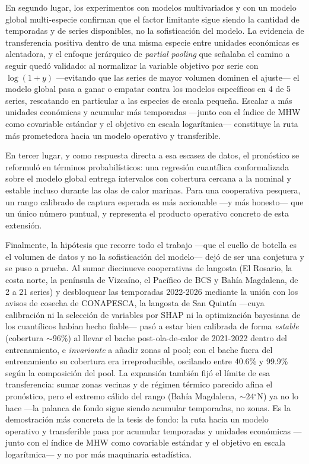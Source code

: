 \documentclass[twoside,11pt]{article}
\begin{document}
En segundo lugar, los experimentos con modelos multivariados y con un modelo global multi-especie confirman que el factor limitante sigue siendo la cantidad de temporadas y de series disponibles, no la sofisticación del modelo. La evidencia de transferencia positiva dentro de una misma especie entre unidades económicas es alentadora, y el enfoque jerárquico de \emph{partial pooling} que señalaba el camino a seguir quedó validado: al normalizar la variable objetivo por serie con $\log(1+y)$ —evitando que las series de mayor volumen dominen el ajuste— el modelo global pasa a ganar o empatar contra los modelos específicos en 4 de 5 series, rescatando en particular a las especies de escala pequeña. Escalar a más unidades económicas y acumular más temporadas —junto con el índice de MHW como covariable estándar y el objetivo en escala logarítmica— constituye la ruta más prometedora hacia un modelo operativo y transferible.

En tercer lugar, y como respuesta directa a esa escasez de datos, el pronóstico se reformuló en términos probabilísticos: una regresión cuantílica conformalizada sobre el modelo global entrega intervalos con cobertura cercana a la nominal y estable incluso durante las olas de calor marinas. Para una cooperativa pesquera, un rango calibrado de captura esperada es más accionable ---y más honesto--- que un único número puntual, y representa el producto operativo concreto de esta extensión.

Finalmente, la hipótesis que recorre todo el trabajo ---que el cuello de botella es el volumen de datos y no la sofisticación del modelo--- dejó de ser una conjetura y se puso a prueba. Al sumar diecinueve cooperativas de langosta (El Rosario, la costa norte, la península de Vizcaíno, el Pacífico de BCS y Bahía Magdalena, de 2 a 21 series) y desbloquear las temporadas 2022-2026 mediante la unión con los avisos de cosecha de CONAPESCA, la langosta de San Quintín ---cuya calibración ni la selección de variables por SHAP ni la optimización bayesiana de los cuantílicos habían hecho fiable--- pasó a estar bien calibrada de forma \emph{estable} (cobertura $\sim$96\%) al llevar el bache post-ola-de-calor de 2021-2022 dentro del entrenamiento, e \emph{invariante} a añadir zonas al pool; con el bache fuera del entrenamiento su cobertura era irreproducible, oscilando entre 40.6\% y 99.9\% según la composición del pool. La expansión también fijó el límite de esa transferencia: sumar zonas vecinas y de régimen térmico parecido afina el pronóstico, pero el extremo cálido del rango (Bahía Magdalena, $\sim$24$^\circ$N) ya no lo hace ---la palanca de fondo sigue siendo acumular temporadas, no zonas. Es la demostración más concreta de la tesis de fondo: la ruta hacia un modelo operativo y transferible pasa por acumular temporadas y unidades económicas ---junto con el índice de MHW como covariable estándar y el objetivo en escala logarítmica--- y no por más maquinaria estadística.
\end{document}
